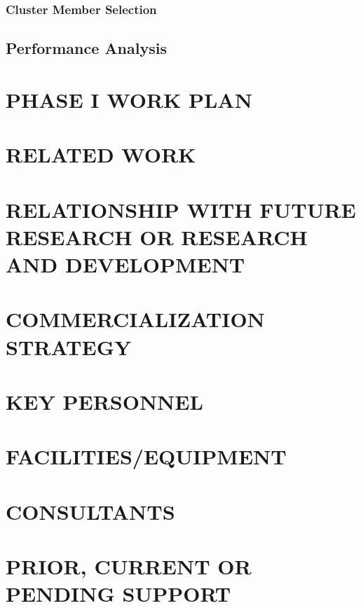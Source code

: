 \documentclass[letterpaper,11pt]{article}
\begin{document}
\subsubsection{Cluster Member Selection}
 
 
 

\subsection{Performance Analysis}


\section{PHASE I WORK PLAN}

\section{RELATED WORK}

\section{RELATIONSHIP WITH FUTURE RESEARCH OR RESEARCH AND DEVELOPMENT}

\section{COMMERCIALIZATION STRATEGY}

\section{KEY PERSONNEL}

\section{FACILITIES/EQUIPMENT}

\section{CONSULTANTS}

\section{PRIOR, CURRENT OR PENDING SUPPORT}



\end{document}
